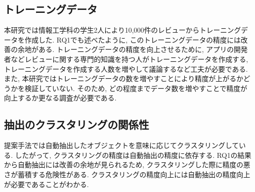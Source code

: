 \subsection{トレーニングデータ}
本研究では情報工学科の学生2人により10,000件のレビューからトレーニングデータを作成した. RQ1でも述べたように, このトレーニングデータの精度には改善の余地がある. 
トレーニングデータの精度を向上させるために, アプリの開発者などレビューに関する専門的知識を持つ人がトレーニングデータを作成する, トレーニングデータを作成する人数を増やして議論するなど工夫が必要である. 
また, 本研究ではトレーニングデータの数を増やすことにより精度が上がるかどうかを検証していない. そのため, どの程度までデータ数を増やすことで精度が向上するか更なる調査が必要である. 

\subsection{抽出のクラスタリングの関係性}
提案手法では自動抽出したオブジェクトを意味に応じてクラスタリングしている. したがって, クラスタリングの精度は自動抽出の精度に依存する. 
RQ1の結果から自動抽出には改善の余地が見られるため, クラスタリングした際に精度の悪さが蓄積する危険性がある. クラスタリングの精度向上には自動抽出の精度向上が必要であることがわかる. 